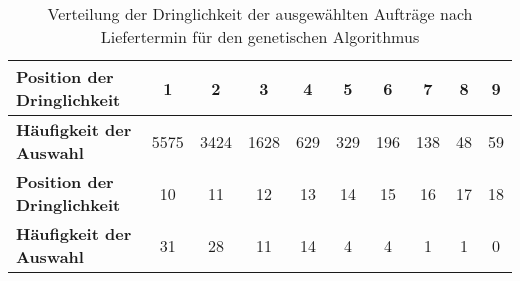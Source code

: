 \begin{table}[ht]
\centering
\caption{Verteilung der Dringlichkeit der ausgewählten Aufträge nach Liefertermin für den genetischen Algorithmus}
\begin{tabular}{lccccccccc}
\hline
\textbf{Position der Dringlichkeit} & 1 & 2 & 3 & 4 & 5 & 6 & 7 & 8 & 9 \\
\hline
\textbf{Häufigkeit der Auswahl} & 5575 & 3424 & 1628 & 629 & 329 & 196 & 138 & 48 & 59 \\
\hline
\hline
\textbf{Position der Dringlichkeit} & 10 & 11 & 12 & 13 & 14 & 15 & 16 & 17 & 18 \\
\hline
\textbf{Häufigkeit der Auswahl} & 31 & 28 & 11 & 14 & 4 & 4 & 1 & 1 & 0 \\
\hline
\end{tabular}
\end{table}
